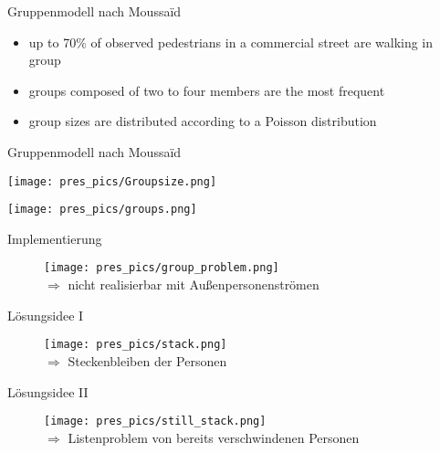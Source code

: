 \begin{frame}{Gruppenmodell nach Moussa\"{i}d}
	\begin{itemize}
		\item up to 70\% of observed pedestrians in a commercial street are walking in group \cite{moussaid-2010b}
		\item groups composed of two to four members are the most frequent \cite{moussaid-2010b}
		\item group sizes are distributed according to a Poisson distribution \cite{jamesj-1953}
	\end{itemize}
\end{frame}

\begin{frame}{Gruppenmodell nach Moussa\"{i}d}
	\begin{minipage}{0.50\textwidth}
		\texttt{[image: pres\_pics/Groupsize.png]}
	\end{minipage} \hfill
	\begin{minipage}{0.48\textwidth}
	\texttt{[image: pres\_pics/groups.png]}
\end{minipage}
\end{frame}
\begin{frame}{Implementierung}
	\begin{figure}
		\texttt{[image: pres\_pics/group\_problem.png]}\\
		$\Rightarrow$ nicht realisierbar mit Außenpersonenströmen
	\end{figure}
\end{frame}
\begin{frame}{Lösungsidee I}
	\begin{figure}
		\texttt{[image: pres\_pics/stack.png]}\\
		$\Rightarrow$ Steckenbleiben der Personen
	\end{figure}
\end{frame}
\begin{frame}{Lösungsidee II}
	\begin{figure}
		\texttt{[image: pres\_pics/still\_stack.png]}\\
		$\Rightarrow$ Listenproblem von bereits verschwindenen Personen
	\end{figure}
\end{frame}
